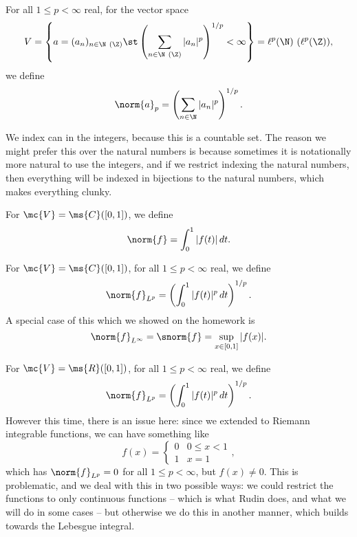 \begin{example}
    For all \(1\leq p<\infty\) real, for the vector space
    \begin{equation*} 
        V=\left\{a=(a_n)_{n\in\N~(\Z)}\st \left(\sum_{n\in\N~(\Z)} |a_n|^p\right)^{1/p}<\infty\right\}=\ell^p(\N)~(\ell^p(\Z)),
    \end{equation*}
    we define 
    \begin{equation*} 
        \norm{a}_p=\left(\sum_{n\in\N}|a_n|^p\right)^{1/p}.
    \end{equation*}
\end{example}
\begin{note}
    We index can in the integers, because this is a countable set. The reason we might prefer this over the natural numbers is because sometimes it is notationally more natural to use the integers, and if we restrict indexing the natural numbers, then everything will be indexed in bijections to the natural numbers, which makes everything clunky.
\end{note}
\begin{example}
    For \(\mc{V}=\ms{C}([0,1])\), we define 
    \begin{equation*} 
        \norm{f}=\int_0^1 |f(t)| \, dt.
    \end{equation*}
\end{example}
\begin{example}
    For \(\mc{V}=\ms{C}([0,1])\), for all \(1\leq p<\infty\) real, we define
    \begin{equation*} 
        \norm{f}_{L^p}=\left(\int_0^1 |f(t)|^p \, dt\right)^{1/p}.
    \end{equation*}
    A special case of this which we showed on the homework is 
    \begin{equation*} 
        \norm{f}_{L^{\infty}}=\snorm{f}=\sup_{x\in [0,1]}|f(x)|.
    \end{equation*}
\end{example}
\begin{example}
    For \(\mc{V}=\ms{R}([0,1])\), for all \(1\leq p<\infty\) real, we define
    \begin{equation*} 
        \norm{f}_{L^p}=\left(\int_0^1 |f(t)|^p \, dt\right)^{1/p}.
    \end{equation*}
    However this time, there is an issue here: since we extended to Riemann integrable functions, we can have something like 
    \begin{equation*} 
        f(x)=\begin{cases}
                0&0\leq x<1\\
                1&x=1
             \end{cases},
    \end{equation*}
    which has \(\norm{f}_{L^p}=0\) for all \(1\leq p<\infty\), but \(f(x)\neq 0\). This is problematic, and we deal with this in two possible ways: we could restrict the functions to only continuous functions -- which is what Rudin does, and what we will do in some cases -- but otherwise we do this in another manner, which builds towards the Lebesgue integral.\label{problematic}
\end{example}
